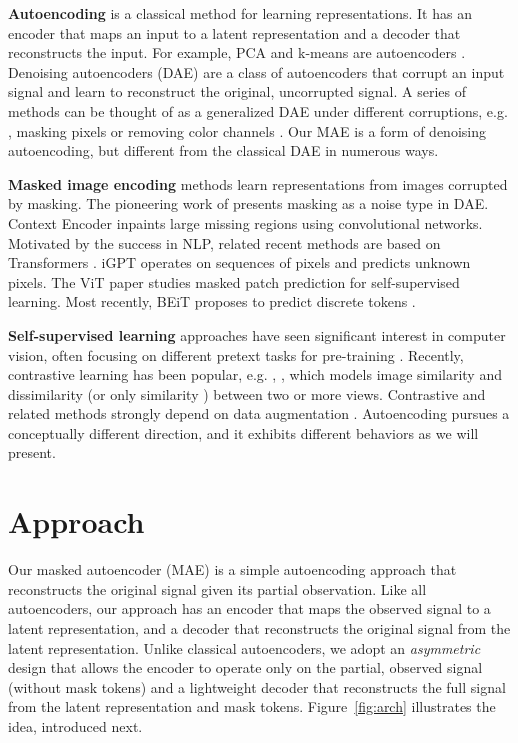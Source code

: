 \textbf{Autoencoding} is a classical method for learning representations. It has an encoder that maps an input to a latent representation and a decoder that reconstructs the input. For example, PCA and k-means are autoencoders \cite{Hinton1994}. Denoising autoencoders (DAE) \cite{Vincent2008} are a class of autoencoders that corrupt an input signal and learn to reconstruct the original, uncorrupted signal. A series of methods can be thought of as a generalized DAE under different corruptions, e.g. , masking pixels \cite{Vincent2010, Pathak2016, Chen2020c} or removing color channels \cite{Zhang2016}. Our MAE is a form of denoising autoencoding, but different from the classical DAE in numerous ways.

\textbf{Masked image encoding} methods learn representations from images corrupted by masking. The pioneering work of \cite{Vincent2010} presents masking as a noise type in DAE. Context Encoder \cite{Pathak2016} inpaints large missing regions using convolutional networks. Motivated by the success in NLP, related recent methods \cite{Chen2020c, Dosovitskiy2021, Bao2021} are based on Transformers \cite{Vaswani2017}. iGPT \cite{Chen2020c} operates on sequences of pixels and predicts unknown pixels. The ViT paper \cite{Dosovitskiy2021} studies masked patch prediction for self-supervised learning. Most recently, BEiT \cite{Bao2021} proposes to predict discrete tokens \cite{Oord2017, Ramesh2021}.

\textbf{Self-supervised learning} approaches have seen significant interest in computer vision, often focusing on different pretext tasks for pre-training \cite{Doersch2015, Wang2015a, Noroozi2016, Zhang2016, Pathak2017, Gidaris2018}. Recently, contrastive learning \cite{Becker1992, Hadsell2006} has been popular, e.g. , \cite{Wu2018a, Oord2018, He2020, Chen2020}, which models image similarity and dissimilarity (or only similarity \cite{Grill2020, Chen2021}) between two or more views. Contrastive and related methods strongly depend on data augmentation \cite{Chen2020, Grill2020, Chen2021}. Autoencoding pursues a conceptually different direction, and it exhibits different behaviors as we will present.

\section{Approach}
\label{sec:approach}

Our masked autoencoder (MAE) is a simple autoencoding approach that reconstructs the original signal given its partial observation. Like all autoencoders, our approach has an encoder that maps the observed signal to a latent representation, and a decoder that reconstructs the original signal from the latent representation. Unlike classical autoencoders, we adopt an \emph{asymmetric} design that allows the encoder to operate only on the partial, observed signal (without mask tokens) and a lightweight decoder that reconstructs the full signal from the latent representation and mask tokens. Figure~\ref{fig:arch} illustrates the idea, introduced next.

